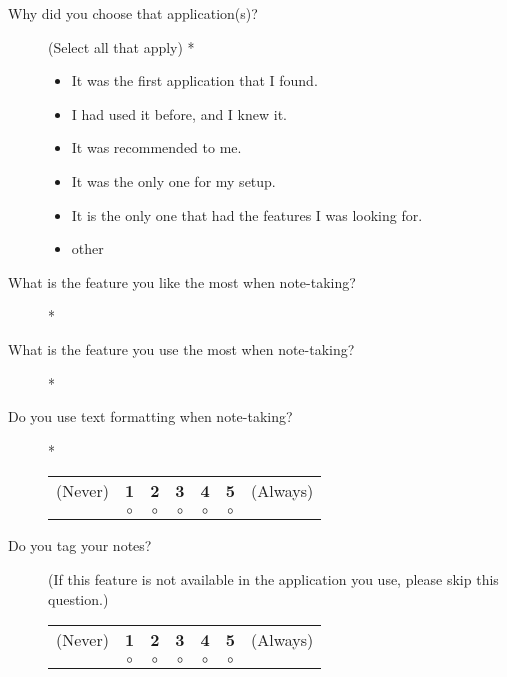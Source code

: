 \begin{description}
 \item[Why did you choose that application(s)?] (Select all that apply) *

\begin{itemize}[$\square$]
\item It was the first application that I found.
\item I had used it before, and I knew it.
\item It was recommended to me.
\item It was the only one for my setup.
\item It is the only one that had the features I was looking for.
\item other
\end{itemize}
\end{description}

\begin{description}
 \item[What is the feature you like the most when note-taking?] *
\end{description}

\begin{description}
 \item[What is the feature you use the most when note-taking?] *
\end{description}

\begin{description}
 \item[Do you use text formatting when note-taking?] *

\begin{tabular}{ccccccc}
(Never) & \textbf{1} & \textbf{2} & \textbf{3} & \textbf{4} & \textbf{5} & (Always) \\
& $\circ$ & $\circ$ & $\circ$ & $\circ$ & $\circ$ & \\
\end{tabular}
\end{description}

\begin{description}
 \item[Do you tag your notes?] (If this feature is not available in the application you use, please skip this question.)

\begin{tabular}{ccccccc}
(Never) & \textbf{1} & \textbf{2} & \textbf{3} & \textbf{4} & \textbf{5} & (Always) \\
& $\circ$ & $\circ$ & $\circ$ & $\circ$ & $\circ$ & \\
\end{tabular}
\end{description}

